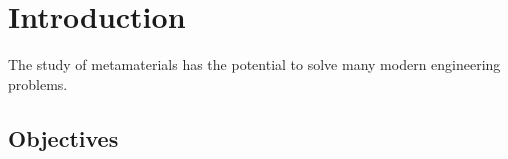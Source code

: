 \chapter{Introduction}
The study of metamaterials has the potential to solve many modern engineering problems.
\section{Objectives}
